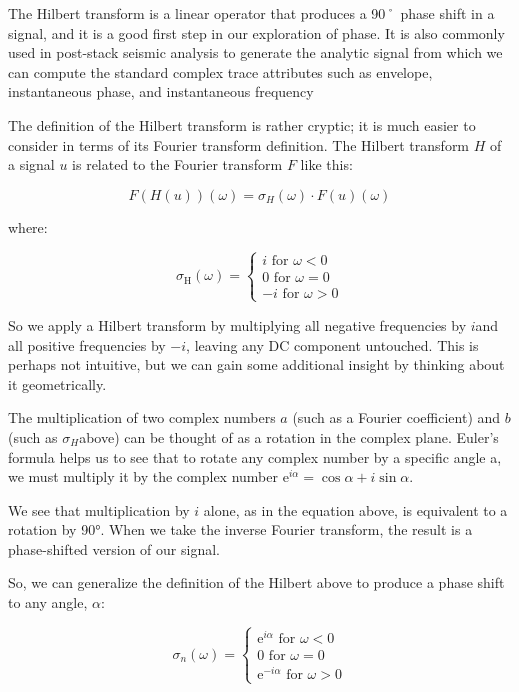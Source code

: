 The Hilbert transform is a linear operator that produces a 90˚ phase shift in a signal, and it is a good first step in our exploration of phase. It is also commonly used in post-stack seismic analysis to generate the analytic signal from which we can compute the standard complex trace attributes such as envelope, instantaneous phase, and instantaneous frequency

The definition of the Hilbert transform is rather cryptic; it is much easier to consider in terms of its Fourier transform definition. The Hilbert transform $H$ of a signal $u$ is related to the Fourier transform $F$ like this:

\begin{equation}
  \label{a94216e5}
  F(H(u))(\omega) = \sigma_H(\omega) \cdot F(u)(\omega)
\end{equation}

where:

\begin{equation}
  \label{a26fb23d}
  \sigma_{\mathrm{H}}(\omega)=\left\{\begin{array}{l}i \text { for } \omega<0 \\ 0 \text { for } \omega=0 \\ -i \text { for } \omega>0\end{array}\right.
\end{equation}

So we apply a Hilbert transform by multiplying all negative frequencies by $i$and all positive frequencies by $-i$, leaving any DC component untouched. This is perhaps not intuitive, but we can gain some additional insight by thinking about it geometrically.

The multiplication of two complex numbers $a$ (such as a Fourier coefficient) and $b$ (such as $\sigma_H$above) can be thought of as a rotation in the complex plane. Euler’s formula helps us to see that to rotate any complex number by a specific angle a, we must multiply it by the complex number $\mathrm{e}^{i \alpha}=\cos \alpha+i \sin \alpha$.

We see that multiplication by $i$ alone, as in the equation above, is equivalent to a rotation by 90°. When we take the inverse Fourier transform, the result is a phase-shifted version of our signal.

So, we can generalize the definition of the Hilbert above to produce a phase shift to any angle, $\alpha$:

\begin{equation}
  \label{a743ceff}
  \sigma_{n}(\omega)=\left\{\begin{array}{l}\mathrm{e}^{i \alpha} \text { for } \omega<0 \\ 0 \text { for } \omega=0 \\ \mathrm{e}^{-i \alpha} \text { for } \omega>0\end{array}\right.
\end{equation}

